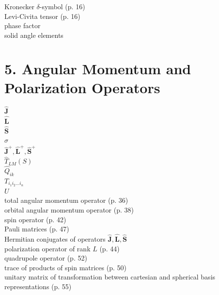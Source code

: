 Kronecker $\delta$-symbol (p. 16)\\
Levi-Civita tensor (p. 16)\\
phase factor\\
solid angle elements

\section*{5. Angular Momentum and Polarization Operators}
$\widehat{\mathbf{J}}$\\
$\hat{\mathbf{L}}$\\
$\hat{\mathbf{S}}$\\
$\sigma$\\
$\widehat{\mathbf{J}}^{+}, \widehat{\mathbf{L}}^{+}, \widehat{\mathbf{S}}^{+}$\\
$\widehat{T}_{L M}(S)$\\
$\widehat{Q}_{i k}$\\
$T_{i_{1} i_{2} \ldots i_{n}}$\\
$U$\\
total angular momentum operator (p. 36)\\
orbital angular momentum operator (p. 38)\\
spin operator (p. 42)\\
Pauli matrices (p. 47)\\
Hermitian conjugates of operators $\widehat{\mathbf{J}}, \widehat{\mathbf{L}}, \widehat{\mathbf{S}}$\\
polarization operator of rank $L$ (p. 44)\\
quadrupole operator (p. 52)\\
trace of products of spin matrices (p. 50)\\
unitary matrix of transformation between cartesian and spherical basis representations (p. 55)

